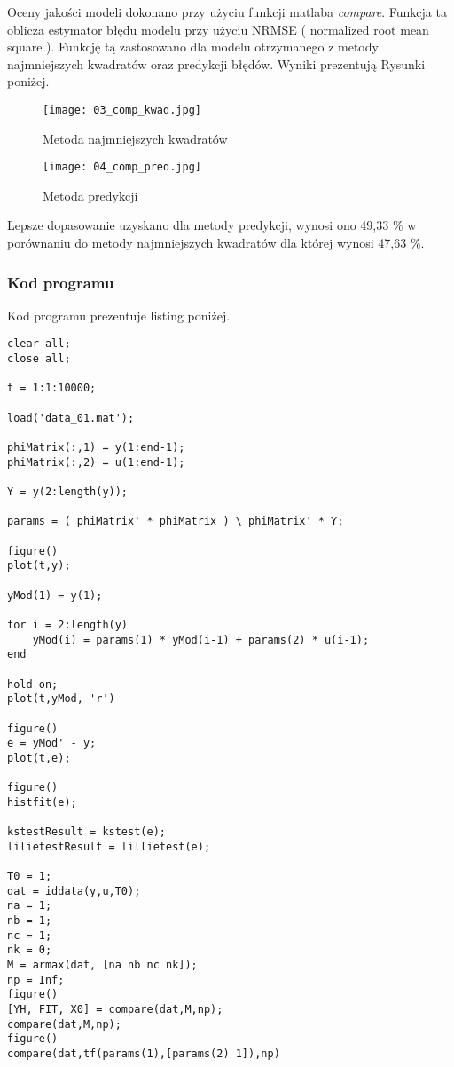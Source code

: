 \documentclass[a4paper,15pt]{article}
\begin{document}
Oceny jakości modeli dokonano przy użyciu funkcji matlaba \textit{compare}. Funkcja ta oblicza estymator błędu modelu przy użyciu NRMSE ( normalized root mean square ). Funkcję tą zastosowano dla modelu otrzymanego z metody najmniejszych kwadratów oraz predykcji błędów. Wyniki prezentują Rysunki poniżej. 

\begin{figure}[H]
\centerline{\texttt{[image: 03\_comp\_kwad.jpg]}}
\centering
\caption{Metoda najmniejszych kwadratów}
\label{fig:01_kwad_hist}
\end{figure}

\begin{figure}[H]
\centerline{\texttt{[image: 04\_comp\_pred.jpg]}}
\centering
\caption{Metoda predykcji}
\label{fig:01_kwad_hist}
\end{figure}

Lepsze dopasowanie uzyskano dla metody predykcji, wynosi ono 49,33 \% w porównaniu do metody najmniejszych kwadratów dla której wynosi 47,63 \%. 




\subsubsection{Kod programu}
Kod programu prezentuje listing poniżej.
\begin{lstlisting}[caption=Zadanie 1, captionpos=b,label=lis1, firstnumber=1,frame=single]
clear all;
close all;

t = 1:1:10000;

load('data_01.mat');

phiMatrix(:,1) = y(1:end-1);
phiMatrix(:,2) = u(1:end-1);

Y = y(2:length(y));

params = ( phiMatrix' * phiMatrix ) \ phiMatrix' * Y;

figure()
plot(t,y);

yMod(1) = y(1);

for i = 2:length(y)
    yMod(i) = params(1) * yMod(i-1) + params(2) * u(i-1);
end

hold on;
plot(t,yMod, 'r')

figure()
e = yMod' - y;
plot(t,e);

figure()
histfit(e);

kstestResult = kstest(e);
lilietestResult = lillietest(e);

T0 = 1;
dat = iddata(y,u,T0); 
na = 1;
nb = 1;
nc = 1;
nk = 0;
M = armax(dat, [na nb nc nk]);
np = Inf;
figure()
[YH, FIT, X0] = compare(dat,M,np);
compare(dat,M,np);
figure()
compare(dat,tf(params(1),[params(2) 1]),np) 
\end{lstlisting}
\end{document}
